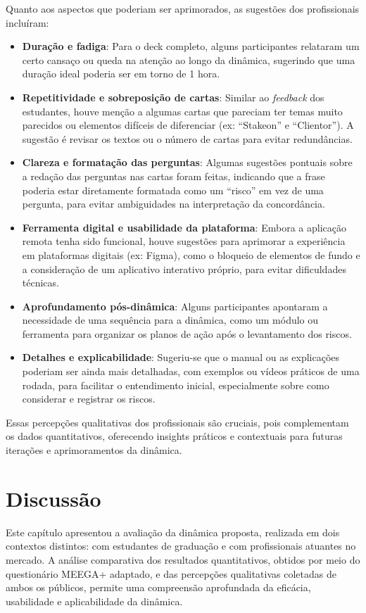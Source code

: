 \documentclass[
	12pt,
	openright,
	twoside,
	a4paper,
	english,
	brazil
	]{abntex2}
\begin{document}
Quanto aos aspectos que poderiam ser aprimorados, as sugestões dos profissionais incluíram:
\begin{itemize}
  \item \textbf{Duração e fadiga}: Para o deck completo, alguns participantes relataram um certo cansaço ou queda na atenção ao longo da dinâmica, sugerindo que uma duração ideal poderia ser em torno de 1 hora.
  \item \textbf{Repetitividade e sobreposição de cartas}: Similar ao \textit{feedback} dos estudantes, houve menção a algumas cartas que pareciam ter temas muito parecidos ou elementos difíceis de diferenciar (ex:  “Stakeon” e  “Clientor”). A sugestão é revisar os textos ou o número de cartas para evitar redundâncias.
  \item \textbf{Clareza e formatação das perguntas}: Algumas sugestões pontuais sobre a redação das perguntas nas cartas foram feitas, indicando que a frase poderia estar diretamente formatada como um “risco” em vez de uma pergunta, para evitar ambiguidades na interpretação da concordância.
  \item \textbf{Ferramenta digital e usabilidade da plataforma}: Embora a aplicação remota tenha sido funcional, houve sugestões para aprimorar a experiência em plataformas digitais (ex: Figma), como o bloqueio de elementos de fundo e a consideração de um aplicativo interativo próprio, para evitar dificuldades técnicas.
  \item \textbf{Aprofundamento pós-dinâmica}: Alguns participantes apontaram a necessidade de uma sequência para a dinâmica, como um módulo ou ferramenta para organizar os planos de ação após o levantamento dos riscos.
  \item \textbf{Detalhes e explicabilidade}: Sugeriu-se que o manual ou as explicações poderiam ser ainda mais detalhadas, com exemplos ou vídeos práticos de uma rodada, para facilitar o entendimento inicial, especialmente sobre como considerar e registrar os riscos.
\end{itemize}

Essas percepções qualitativas dos profissionais são cruciais, pois complementam os dados quantitativos, oferecendo insights práticos e contextuais para futuras iterações e aprimoramentos da dinâmica.

\section{Discussão}
\label{sec:discussao}

Este capítulo apresentou a avaliação da dinâmica proposta, realizada em dois contextos distintos: com estudantes de graduação e com profissionais atuantes no mercado. A análise comparativa dos resultados quantitativos, obtidos por meio do questionário MEEGA+ adaptado, e das percepções qualitativas coletadas de ambos os públicos, permite uma compreensão aprofundada da eficácia, usabilidade e aplicabilidade da dinâmica.
\end{document}
